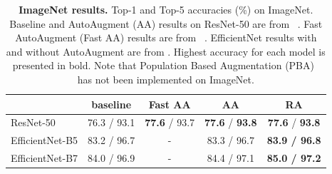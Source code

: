 \begin{table}[!ht]
\centering
\small
\begin{tabular}{l|cccc}
   & baseline        & Fast AA &   AA    &  RA \\
  \hline 
  ResNet-50 & 76.3 / 93.1 & \textbf{77.6} / 93.7 & \textbf{77.6} / \textbf{93.8} & \textbf{77.6} / \textbf{93.8}  \\ 
  EfficientNet-B5 & 83.2 / 96.7 & - & 83.3 / 96.7& \textbf{83.9 / 96.8}\\ 
  EfficientNet-B7 & 84.0 / 96.9 & - & 84.4 / 97.1 & \textbf{85.0 / 97.2}\\ 
  \hline
\end{tabular}
\vspace{0.2cm}
\caption{\textbf{ImageNet results.} Top-1 and Top-5 accuracies (\%) on ImageNet. Baseline and AutoAugment (AA) results on ResNet-50 are from ~\cite{cubuk2018autoaugment}.
Fast AutoAugment (Fast AA) results are from ~\cite{lim2019fast}. EfficientNet results with and without AutoAugment are from \cite{tan2019efficientnet}. Highest accuracy for each model is presented in bold. Note that Population Based Augmentation (PBA)~\cite{ho2019population} has not been implemented on ImageNet.}
\label{tab:imagenet_results}  
\end{table}
